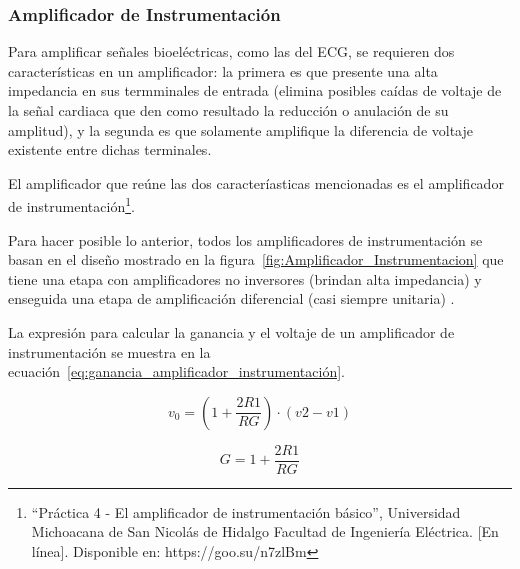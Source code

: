         \subsubsection{Amplificador de Instrumentación}
            Para amplificar señales bioeléctricas, como las del ECG, se requieren dos características en un amplificador: la primera es que presente una alta impedancia en sus termminales de entrada (elimina posibles caídas de voltaje de la señal cardiaca que den como resultado la reducción o anulación de su amplitud), y la segunda es que solamente amplifique la diferencia de voltaje existente entre dichas terminales. 
            
            El amplificador que reúne las dos caracteríasticas mencionadas es el amplificador de instrumentación\footnote{``Práctica 4 - El amplificador de instrumentación básico'', Universidad Michoacana de San Nicolás de Hidalgo Facultad de Ingeniería Eléctrica. [En línea]. Disponible en: https://goo.su/n7zlBm}.

            Para hacer posible lo anterior, todos los amplificadores de instrumentación se basan en el diseño mostrado en la figura~\ref{fig:Amplificador_Instrumentacion} que tiene una etapa con amplificadores no inversores (brindan alta impedancia) y enseguida una etapa de amplificación diferencial (casi siempre unitaria) \cite{Diaz_amplificacion_señales}.

            La expresión para calcular la ganancia y el voltaje de un amplificador de instrumentación se muestra en la ecuación~\ref{eq:ganancia_amplificador_instrumentación}.

            \begin{equation}
                \label{eq:voltaje_amplificador_instrumentación}
                v_0 = (1 + \frac{2R1}{RG}) \cdot (v2 - v1)
            \end{equation}

            \begin{equation}
                \label{eq:ganancia_amplificador_instrumentación}
                G = 1 + \frac{2R1}{RG}
            \end{equation}

